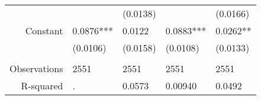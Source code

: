 \begin{tabular}{rrrrr}
      & \multicolumn{1}{l}{} & \multicolumn{1}{l}{(0.0138)} & \multicolumn{1}{l}{} & \multicolumn{1}{l}{(0.0166)} \\
Constant & \multicolumn{1}{l}{0.0876***} & \multicolumn{1}{l}{0.0122} & \multicolumn{1}{l}{0.0883***} & \multicolumn{1}{l}{0.0262**} \\
      & \multicolumn{1}{l}{(0.0106)} & \multicolumn{1}{l}{(0.0158)} & \multicolumn{1}{l}{(0.0108)} & \multicolumn{1}{l}{(0.0133)} \\
      & \multicolumn{1}{l}{} & \multicolumn{1}{l}{} & \multicolumn{1}{l}{} & \multicolumn{1}{l}{} \\
Observations & \multicolumn{1}{l}{2551} & \multicolumn{1}{l}{2551} & \multicolumn{1}{l}{2551} & \multicolumn{1}{l}{2551} \\
R-squared & \multicolumn{1}{l}{.} & \multicolumn{1}{l}{0.0573} & \multicolumn{1}{l}{0.00940} & \multicolumn{1}{l}{0.0492} \\
\bottomrule
\end{tabular}%
